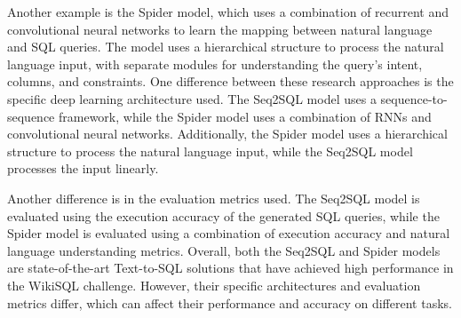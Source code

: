 Another example is the Spider model, which uses a combination of recurrent and convolutional neural networks to learn the mapping between natural language and SQL queries. The model uses a hierarchical structure to process the natural language input, with separate modules for understanding the query's intent, columns, and constraints.
One difference between these research approaches is the specific deep learning architecture used. The Seq2SQL model uses a sequence-to-sequence framework, while the Spider model uses a combination of RNNs and convolutional neural networks. Additionally, the Spider model uses a hierarchical structure to process the natural language input, while the Seq2SQL model processes the input linearly.

Another difference is in the evaluation metrics used. The Seq2SQL model is evaluated using the execution accuracy of the generated SQL queries, while the Spider model is evaluated using a combination of execution accuracy and natural language understanding metrics.
Overall, both the Seq2SQL and Spider models are state-of-the-art Text-to-SQL solutions that have achieved high performance in the WikiSQL challenge. However, their specific architectures and evaluation metrics differ, which can affect their performance and accuracy on different tasks.